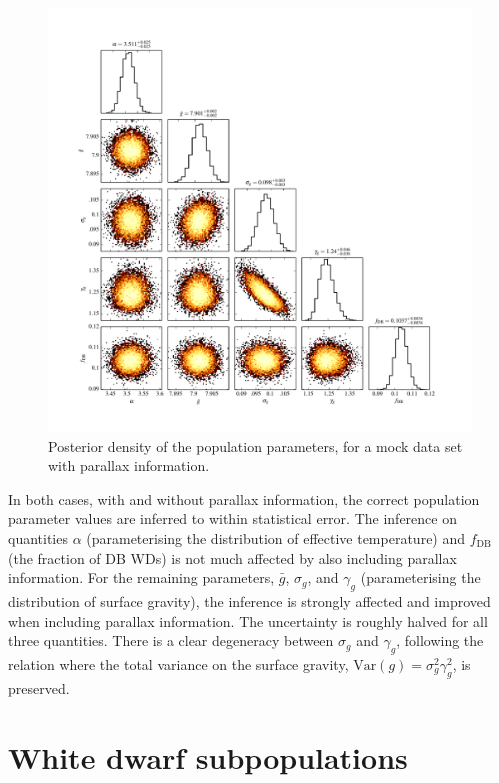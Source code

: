 \documentclass[fleqn,usenatbib]{mnras}
\newcommand{\logg}{g}
\begin{document}
\begin{figure}
	\includegraphics[width=1.\textwidth]{toy_chain_include-parallax.pdf}
    \caption{Posterior density of the population parameters, for a mock data set with parallax information.}
    \label{fig:chain_parallax}
\end{figure}

In both cases, with and without parallax information, the correct population parameter values are inferred to within statistical error. The inference on quantities $\alpha$ (parameterising the distribution of effective temperature) and $f_\text{DB}$ (the fraction of DB WDs) is not much affected by also including parallax information. For the remaining parameters, $\bar{g}$, $\sigma_g$, and $\gamma_g$ (parameterising the distribution of surface gravity), the inference is strongly affected and improved when including parallax information. The uncertainty is roughly halved for all three quantities. There is a clear degeneracy between $\sigma_g$ and $\gamma_g$, following the relation where the total variance on the surface gravity, $\text{Var}(\logg) = \sigma_g^2\gamma_g^2$, is preserved.







\section{White dwarf subpopulations}\label{sec:subpopulations}
\end{document}
